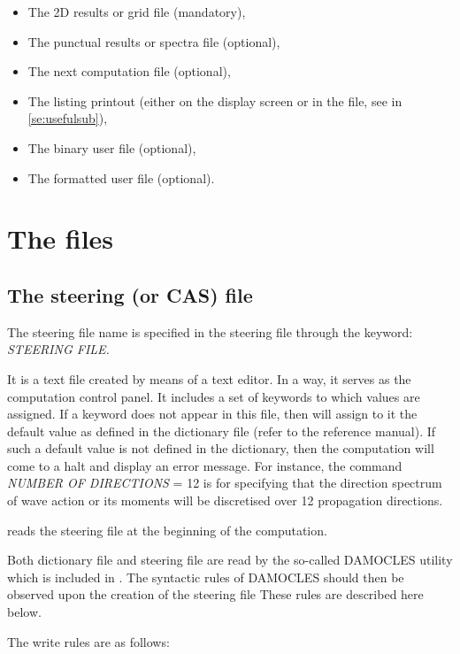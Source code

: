 \begin{itemize}
\item  The 2D results or grid file (mandatory),
\item  The punctual results or spectra file (optional),
\item  The next computation file (optional),
\item  The listing printout (either on the display screen or in the file, see in
  \ref{se:usefulsub}),
\item  The binary user file (optional),
\item  The formatted user file (optional).
\end{itemize}

\section{ The files}

\subsection{ The steering (or CAS) file}
\label{se:steeringfile}
The steering file name is specified in the steering file through the keyword:
\textit{STEERING FILE.}

It is a text file created by means of a text editor. In a way, it serves as the
computation control panel. It includes a set of keywords to which values are assigned.
If a keyword does not appear in this file, then \tomawac will assign to it the default
value as defined in the dictionary file (refer to the reference manual). If such a
default value is not defined in the dictionary, then the computation will come to a
halt and display an error message. For instance, the command \textit{NUMBER OF
  DIRECTIONS} = 12 is for specifying that the direction spectrum of wave action or its
moments will be discretised over 12 propagation directions.

 \tomawac reads the steering file at the beginning of the computation.

 Both dictionary file and steering file are read by the so-called DAMOCLES utility which
 is included in \tomawac. The syntactic rules of DAMOCLES should then be observed upon
 the creation of the steering file These rules are described here below.

 The write rules are as follows:

